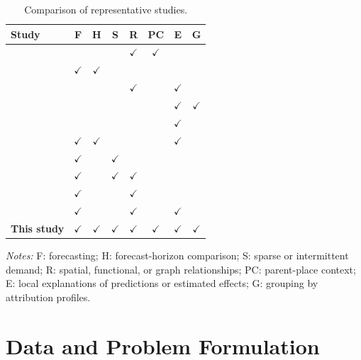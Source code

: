 \documentclass[preprint,authoryear,11pt]{elsarticle}
\theoremstyle{definition}
\begin{document}
\begin{table}[!htbp]
\centering
\caption{Comparison of representative studies.}
\label{tab:literature_comparison}
\small
\renewcommand{\arraystretch}{1.08}
\begin{tabular*}{\textwidth}{@{\extracolsep{\fill}}lccccccc@{}}
\toprule
\textbf{Study} & \textbf{F} & \textbf{H} & \textbf{S} & \textbf{R} & \textbf{PC} & \textbf{E} & \textbf{G} \\
\midrule
\citet{gould2005contracts} &  &  &  & $\checkmark$ & $\checkmark$ &  & \\
\citet{taieb2012review} & $\checkmark$ & $\checkmark$ &  &  &  &  & \\
\citet{ying2019gnnexplainer} &  &  &  & $\checkmark$ &  & $\checkmark$ & \\
\citet{lundberg2020local} &  &  &  &  &  & $\checkmark$ & $\checkmark$ \\
\citet{bento2021timeshap} &  &  &  &  &  & $\checkmark$ & \\
\citet{lim2021temporal} & $\checkmark$ & $\checkmark$ &  &  &  & $\checkmark$ & \\
\citet{turkmen2021forecasting} & $\checkmark$ &  & $\checkmark$ &  &  &  & \\
\citet{zhuang2022uncertainty} & $\checkmark$ &  & $\checkmark$ & $\checkmark$ &  &  & \\
\citet{hajisafi2023learning} & $\checkmark$ &  &  & $\checkmark$ &  &  & \\
\citet{zhang2026causalpoi} & $\checkmark$ &  &  & $\checkmark$ &  & $\checkmark$ & \\
\midrule
\textbf{This study} & $\checkmark$ & $\checkmark$ & $\checkmark$ & $\checkmark$ & $\checkmark$ & $\checkmark$ & $\checkmark$ \\
\bottomrule
\end{tabular*}

\vspace{4pt}
\begin{minipage}{\textwidth}
\footnotesize
\textit{Notes:}
F: forecasting;
H: forecast-horizon comparison;
S: sparse or intermittent demand;
R: spatial, functional, or graph relationships;
PC: parent-place context;
E: local explanations of predictions or estimated effects;
G: grouping by attribution profiles.
\end{minipage}
\end{table}

\section{Data and Problem Formulation}
\label{problem_setting}
\end{document}
